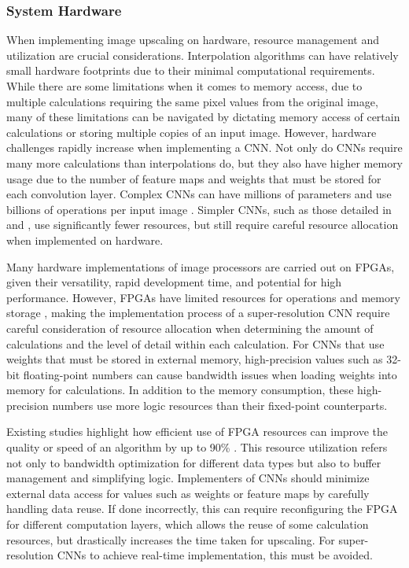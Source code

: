 \documentclass{article}
\begin{document}
        \subsubsection{System Hardware}
        \noindent When implementing image upscaling on hardware, resource management and utilization are crucial considerations. Interpolation algorithms can have relatively small hardware footprints due to their minimal computational requirements. While there are some limitations when it comes to memory access, due to multiple calculations requiring the same pixel values from the original image, many of these limitations can be navigated by dictating memory access of certain calculations or storing multiple copies of an input image. However, hardware challenges rapidly increase when implementing a CNN. Not only do CNNs require many more calculations than interpolations do, but they also have higher memory usage due to the number of feature maps and weights that must be stored for each convolution layer. Complex CNNs can have millions of parameters and use billions of operations per input image \cite{ma_scalable_2016}. Simpler CNNs, such as those detailed in \cite{fsrcnn_dong_accelerating_2016} and \cite{srcnn_dong_2015}, use significantly fewer resources, but still require careful resource allocation when implemented on hardware. 
        \par Many hardware implementations of image processors are carried out on FPGAs, given their versatility, rapid development time, and potential for high performance. However, FPGAs have limited resources for operations and memory storage \cite{zhang_optimizing_2015}, making the implementation process of a super-resolution CNN require careful consideration of resource allocation when determining the amount of calculations and the level of detail within each calculation. For CNNs that use weights that must be stored in external memory, high-precision values such as 32-bit floating-point numbers can cause bandwidth issues when loading weights into memory for calculations. In addition to the memory consumption, these high-precision numbers use more logic resources than their fixed-point counterparts. 
        \par Existing studies highlight how efficient use of FPGA resources can improve the quality or speed of an algorithm by up to 90\% \cite{zhang_optimizing_2015}. This resource utilization refers not only to bandwidth optimization for different data types but also to buffer management and simplifying logic. Implementers of CNNs should minimize external data access for values such as weights or feature maps by carefully handling data reuse. If done incorrectly, this can require reconfiguring the FPGA for different computation layers, which allows the reuse of some calculation resources, but drastically increases the time taken for upscaling. For super-resolution CNNs to achieve real-time implementation, this must be avoided. 
        
\end{document}
